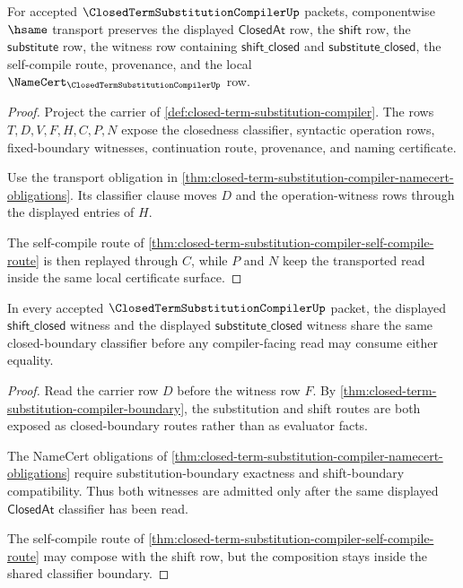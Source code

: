 \begin{theorem}
\label{thm:closed-term-substitution-compiler-classifier-transport}
For accepted $\ClosedTermSubstitutionCompilerUp$ packets, componentwise $\hsame$ transport preserves the displayed $\mathsf{ClosedAt}$ row, the $\mathsf{shift}$ row, the $\mathsf{substitute}$ row, the witness row containing $\mathsf{shift\_closed}$ and $\mathsf{substitute\_closed}$, the self-compile route, provenance, and the local $\NameCert_{\ClosedTermSubstitutionCompilerUp}$ row.
\end{theorem}
\begin{proof}
Project the carrier of \autoref{def:closed-term-substitution-compiler}. The rows $T,D,V,F,H,C,P,N$ expose the closedness classifier, syntactic operation rows, fixed-boundary witnesses, continuation route, provenance, and naming certificate.

Use the transport obligation in \autoref{thm:closed-term-substitution-compiler-namecert-obligations}. Its classifier clause moves $D$ and the operation-witness rows through the displayed entries of $H$.

The self-compile route of \autoref{thm:closed-term-substitution-compiler-self-compile-route} is then replayed through $C$, while $P$ and $N$ keep the transported read inside the same local certificate surface.
\end{proof}

\begin{theorem}
\label{thm:closed-term-substitution-compiler-shift-substitute-compatibility}
In every accepted $\ClosedTermSubstitutionCompilerUp$ packet, the displayed $\mathsf{shift\_closed}$ witness and the displayed $\mathsf{substitute\_closed}$ witness share the same closed-boundary classifier before any compiler-facing read may consume either equality.
\end{theorem}
\begin{proof}
Read the carrier row $D$ before the witness row $F$. By \autoref{thm:closed-term-substitution-compiler-boundary}, the substitution and shift routes are both exposed as closed-boundary routes rather than as evaluator facts.

The NameCert obligations of \autoref{thm:closed-term-substitution-compiler-namecert-obligations} require substitution-boundary exactness and shift-boundary compatibility. Thus both witnesses are admitted only after the same displayed $\mathsf{ClosedAt}$ classifier has been read.

The self-compile route of \autoref{thm:closed-term-substitution-compiler-self-compile-route} may compose with the shift row, but the composition stays inside the shared classifier boundary.
\end{proof}

